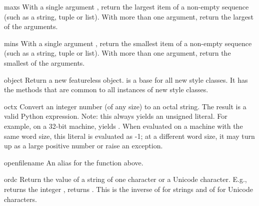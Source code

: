 \begin{funcdesc}{max}{s}
  With a single argument , return the largest item of a
  non-empty sequence (such as a string, tuple or list).  With more
  than one argument, return the largest of the arguments.
\end{funcdesc}

\begin{funcdesc}{min}{s}
  With a single argument , return the smallest item of a
  non-empty sequence (such as a string, tuple or list).  With more
  than one argument, return the smallest of the arguments.
\end{funcdesc}

\begin{funcdesc}{object}{}
  Return a new featureless object.   is a base 
  for all new style classes.  It has the methods that are common
  to all instances of new style classes.

\end{funcdesc}

\begin{funcdesc}{oct}{x}
  Convert an integer number (of any size) to an octal string.  The
  result is a valid Python expression.  Note: this always yields an
  unsigned literal.  For example, on a 32-bit machine, 
  yields .  When evaluated on a machine with the
  same word size, this literal is evaluated as -1; at a different word
  size, it may turn up as a large positive number or raise an
   exception.
\end{funcdesc}

\begin{funcdesc}{open}{filename}
  An alias for the  function above.
\end{funcdesc}

\begin{funcdesc}{ord}{c}
  Return the \ASCII{} value of a string of one character or a Unicode
  character.  E.g.,  returns the integer ,
   returns .  This is the inverse of
   for strings and of  for Unicode
  characters.
\end{funcdesc}

